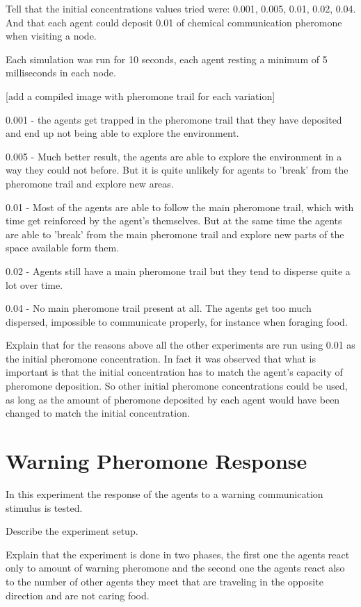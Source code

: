 Tell that the initial concentrations values tried were: 0.001, 0.005, 0.01, 0.02, 0.04. And that each agent could deposit 0.01 of chemical communication pheromone when visiting a node.

Each simulation was run for 10 seconds, each agent resting a minimum of 5 milliseconds in each node.

[add a compiled image with pheromone trail for each variation]

0.001 - the agents get trapped in the pheromone trail that they have deposited and end up not being able to explore the environment.

0.005 - Much better result, the agents are able to explore the environment in a way they could not before. But it is quite unlikely for agents to 'break' from the pheromone trail and explore new areas.

0.01 - Most of the agents are able to follow the main pheromone trail, which with time get reinforced by the agent's themselves. But at the same time the agents are able to 'break' from the main pheromone trail and explore new parts of the space available form them.

0.02 - Agents still have a main pheromone trail but they tend to disperse quite a lot over time.

0.04 - No main pheromone trail present at all. The agents get too much dispersed, impossible to communicate properly, for instance when foraging food.

Explain that for the reasons above all the other experiments are run using 0.01 as the initial pheromone concentration. In fact it was observed that what is important is that the initial concentration has to match the agent's capacity of pheromone deposition. So other initial pheromone concentrations could be used, as long as the amount of pheromone deposited by each agent would have been changed to match the initial concentration.

\section{Warning Pheromone Response}
\label{sec:warn-phero-inv}
In this experiment the response of the agents to a warning communication stimulus is tested.

Describe the experiment setup.

Explain that the experiment is done in two phases, the first one the agents react only to amount of warning pheromone and the second one the agents react also to the number of other agents they meet that are traveling in the opposite direction and are not caring food.

